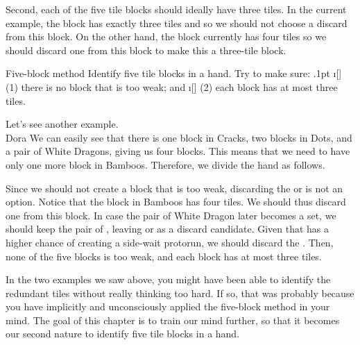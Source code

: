\bigskip
Second, each of the five tile blocks should ideally have three tiles. In the current example, the {\large{}} block has exactly three tiles and so we should not choose a discard from this block. On the other hand, the {\large{}} block currently has four tiles so we should discard one from this block to make this a three-tile block. 

\bigskip
\begin{itembox}[c]{Five-block method}
Identify five tile blocks in a hand. Try to make sure: 
\bi\itemsep.1pt
\i[] (1) there is no block that is too weak; and 
\i[] (2) each block has at most three tiles. 
\ei
\end{itembox}

\bigskip
Let's see another example. 
\bp
{}\bai\bai~\bai\\
\hspace{310pt}\footnotesize{{\jap Dora}}
\ep
We can easily see that there is one block in Cracks, two blocks in Dots, and a pair of White Dragons, giving us four blocks. This means that we need to have only one more block in Bamboos. Therefore, we divide the hand as follows. 

\emj
Since we should not create a block that is too weak, discarding the {\large{}} or {\large{}} is not an option. Notice that the block in Bamboos has four tiles. We should thus discard one from this block. In case the pair of White Dragon later becomes a set, we should keep the pair of {\large{}}, leaving {\large{}} or {\large{}} as a discard candidate. Given that {\large{}} has a higher chance of creating a side-wait protorun, we should discard the {\large{}}. 
Then, none of the five blocks is too weak, and each block has at most three tiles. 

\bigskip
In the two examples we saw above, you might have been able to identify the redundant tiles without really thinking too hard. If so, that was probably because you have implicitly and unconsciously applied the five-block method in your mind. The goal of this chapter is to train our mind further, so that it becomes our second nature to identify five tile blocks in a hand. 


